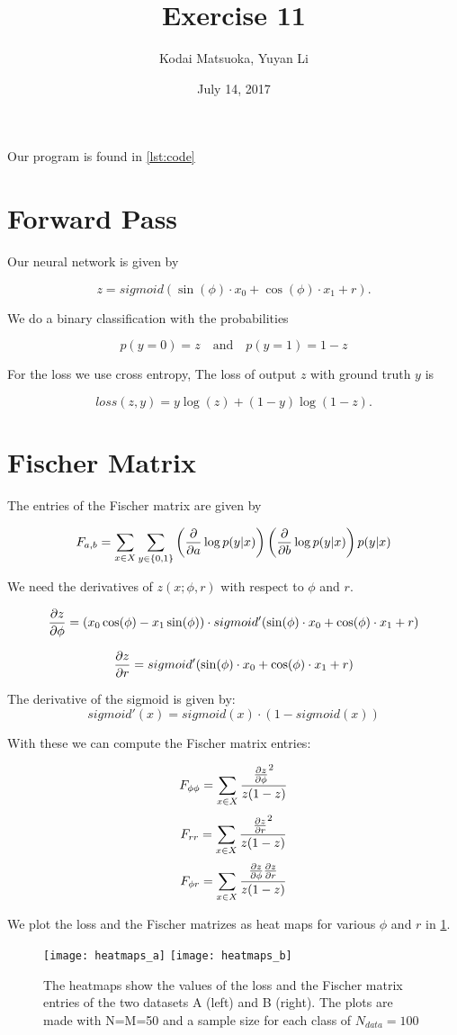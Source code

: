 \documentclass[12pt]{scrartcl}
\author{Kodai Matsuoka, Yuyan Li}
\title{Exercise 11}
\date{July 14, 2017}
\begin{document}
\maketitle

Our program is found in \cref{lst:code}

\section{Forward Pass}

Our neural network is given by

\[
  z = sigmoid(\sin(\phi) \cdot x_0 + \cos(\phi) \cdot x_1 + r).
\]

We do a binary classification with the probabilities

\[ p(y=0)=z \quad \text{and} \quad p(y=1)=1-z \]

For the loss we use cross entropy, The loss of output $z$ with ground truth $y$ is

\[
  loss(z,y) = y \log(z) + (1 - y) \log(1-z).
\]


\section{Fischer Matrix}

The entries of the Fischer matrix are given by

\[
  F_{a,b} = \sum_{x \in X} \sum_{y \in \{0,1\}} \left( \pdv{}{a} \log p(y|x) \right) \left( \pdv{}{b} \log p(y|x) \right) p(y|x)
\]

We need the derivatives of $z(x;\phi,r)$ with respect to $\phi$ and $r$.

\[
  \pdv{z}{\phi} = \left( x_0 \cos(\phi) - x_1 \sin(\phi) \right) \cdot sigmoid'(\sin(\phi) \cdot x_0 + \cos(\phi) \cdot x_1 + r)
\]

\[
  \pdv{z}{r} = sigmoid'(\sin(\phi) \cdot x_0 + \cos(\phi) \cdot x_1 + r)
\]

The derivative of the sigmoid is given by:
\[
  sigmoid'(x) = sigmoid(x) \cdot (1 - sigmoid(x))
\]

With these we can compute the Fischer matrix entries:

\[
  F_{\phi \phi} = \sum_{x \in X} \frac{\pdv{z}{\phi}^2}{z(1-z)}
\]
\[
  F_{rr} = \sum_{x \in X} \frac{\pdv{z}{r}^2}{z(1-z)}
\]
\[
  F_{\phi r} = \sum_{x \in X} \frac{\pdv{z}{\phi} \pdv{z}{r}}{z(1-z)}
\]

We plot the loss and the Fischer matrizes as heat maps for various $\phi$ and $r$ in \cref{fig:hm}.

\begin{figure}[h]
  \centering
  \texttt{[image: heatmaps\_a]}
  \texttt{[image: heatmaps\_b]}
  \caption{The heatmaps show the values of the loss and the Fischer matrix entries of the two datasets A (left) and B (right). The plots are made with N=M=50 and a sample size for each class of $N_{data}=100$}
  \label{fig:hm}
\end{figure}


\clearpage

\end{document}
